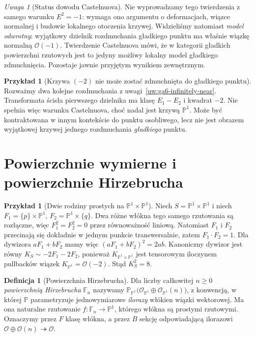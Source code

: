 \documentclass[11pt,a4paper,openany]{report}
\numberwithin{equation}{section}
\theoremstyle{plain}
\theoremstyle{definition}
\newtheorem{definicja}[twierdzenie]{Definicja}
\newtheorem{przyklad}[twierdzenie]{Przykład}
\theoremstyle{remark}
\newtheorem{uwaga}[twierdzenie]{Uwaga}
\newcommand{\PP}{\mathbb P}
\begin{document}
\begin{uwaga}[Status dowodu Castelnuova]
Nie wyprowadzamy tego twierdzenia z samego warunku
$E^2=-1$: wymaga ono argumentu o deformacjach,
wiązce normalnej i budowie lokalnego otoczenia krzywej.
Widzieliśmy natomiast \emph{model odwrotny}: wyjątkowy
dzielnik rozdmuchania gładkiego punktu ma właśnie
wiązkę normalną $\mathcal O(-1)$. Twierdzenie
Castelnuova mówi, że w kategorii gładkich powierzchni
rzutowych jest to jedyny możliwy lokalny model
gładkiego zdmuchnięcia. Pozostaje jawnie przyjętym
wynikiem zewnętrznym.
\end{uwaga}

\begin{przyklad}[Krzywa $(-2)$ nie może zostać zdmuchnięta do gładkiego punktu]
Rozważmy dwa kolejne rozdmuchania z
uwagi~\ref{uw:ga6-infinitely-near}. Transformata
ścisła pierwszego dzielnika ma klasę $E_1-E_2$
i kwadrat $-2$. Nie spełnia więc warunku
Castelnuova, choć nadal jest krzywą $\PP^1$.
Może być kontraktowana w innym kontekście do
punktu osobliwego, lecz nie jest obrazem wyjątkowej
krzywej jednego rozdmuchania \emph{gładkiego} punktu.
\end{przyklad}

\section{Powierzchnie wymierne i powierzchnie Hirzebrucha}
\label{sec:ga6-rational}

\begin{przyklad}[Dwie rodziny prostych na $\PP^1\times\PP^1$]
Niech $S=\PP^1\times\PP^1$ i niech
$F_1=\{p\}\times\PP^1$, $F_2=\PP^1\times\{q\}$.
Dwa różne włókna tego samego rzutowania są rozłączne,
więc $F_1^2=F_2^2=0$ przez równoważność liniową.
Natomiast $F_1$ i $F_2$ przecinają się dokładnie
w jednym punkcie transwersalnie, zatem
$F_1\cdot F_2=1$. Dla dywizora $aF_1+bF_2$
mamy więc $(aF_1+bF_2)^2=2ab$.
Kanoniczny dywizor jest równy
$K_S\sim-2F_1-2F_2$, ponieważ
$K_{\PP^1\times\PP^1}$ jest tensorowym iloczynem
pullbacków wiązek $K_{\PP^1}=\mathcal O(-2)$.
Stąd $K_S^2=8$.
\end{przyklad}

\begin{definicja}[Powierzchnia Hirzebrucha]
Dla liczby całkowitej $n\ge0$ \emph{powierzchnią
Hirzebrucha} $\mathbb F_n$ nazywamy
$\PP_{\PP^1}\bigl(\mathcal O_{\PP^1}\oplus
\mathcal O_{\PP^1}(n)\bigr)$, z konwencją, w której
$\PP$ parametryzuje jednowymiarowe \emph{ilorazy}
włókien wiązki wektorowej. Ma ona naturalne rzutowanie
$f:\mathbb F_n\to\PP^1$, którego włókna są prostymi
rzutowymi. Oznaczymy przez $F$ klasę włókna,
a przez $B$ sekcję odpowiadającą ilorazowi
$\mathcal O\oplus\mathcal O(n)\twoheadrightarrow\mathcal O$.
\end{definicja}
\end{document}
